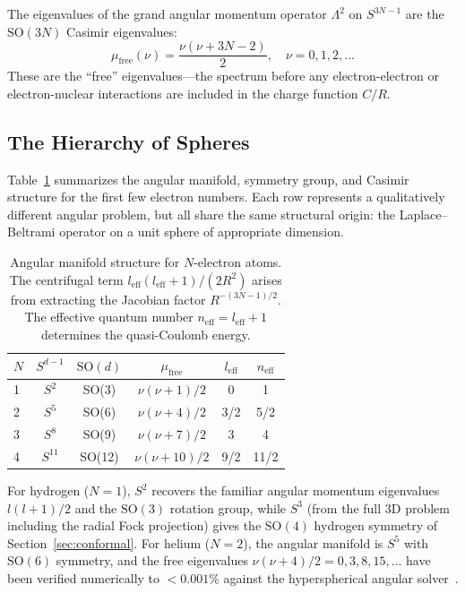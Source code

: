 \documentclass[aps,pra,twocolumn,superscriptaddress,longbibliography]{revtex4-2}
\begin{document}
The eigenvalues of the grand angular momentum operator $\Lambda^2$
on $S^{3N-1}$ are the $\mathrm{SO}(3N)$ Casimir eigenvalues:
\begin{equation}
  \mu_{\mathrm{free}}(\nu) = \frac{\nu(\nu + 3N - 2)}{2},
  \quad \nu = 0, 1, 2, \ldots
  \label{eq:casimir_general}
\end{equation}
These are the ``free'' eigenvalues---the spectrum before any
electron-electron or electron-nuclear interactions are included
in the charge function $C/R$.

\subsection{The Hierarchy of Spheres}

Table~\ref{tab:N_electron} summarizes the angular manifold, symmetry
group, and Casimir structure for the first few electron numbers.
Each row represents a qualitatively different angular problem,
but all share the same structural origin: the Laplace--Beltrami
operator on a unit sphere of appropriate dimension.

\begin{table}[h]
\caption{Angular manifold structure for $N$-electron atoms.
The centrifugal term $l_{\mathrm{eff}}(l_{\mathrm{eff}}+1)/(2R^2)$
arises from extracting the Jacobian factor $R^{-(3N-1)/2}$.
The effective quantum number $n_{\mathrm{eff}} = l_{\mathrm{eff}} + 1$
determines the quasi-Coulomb energy.}
\label{tab:N_electron}
\begin{ruledtabular}
\begin{tabular}{lccccc}
  $N$ & $S^{d-1}$ & $\mathrm{SO}(d)$ & $\mu_{\mathrm{free}}$
  & $l_{\mathrm{eff}}$ & $n_{\mathrm{eff}}$ \\
  \hline
  1 & $S^2$ & SO(3) & $\nu(\nu+1)/2$   & 0   & 1 \\
  2 & $S^5$ & SO(6) & $\nu(\nu+4)/2$   & 3/2 & 5/2 \\
  3 & $S^8$ & SO(9) & $\nu(\nu+7)/2$   & 3   & 4 \\
  4 & $S^{11}$ & SO(12) & $\nu(\nu+10)/2$ & 9/2 & 11/2 \\
\end{tabular}
\end{ruledtabular}
\end{table}

For hydrogen ($N = 1$), $S^2$ recovers the familiar angular momentum
eigenvalues $l(l+1)/2$ and the $\mathrm{SO}(3)$ rotation group, while
$S^3$ (from the full 3D problem including the radial Fock projection)
gives the $\mathrm{SO}(4)$ hydrogen symmetry of Section~\ref{sec:conformal}.
For helium ($N = 2$), the angular manifold is $S^5$ with
$\mathrm{SO}(6)$ symmetry, and the free eigenvalues
$\nu(\nu+4)/2 = 0, 3, 8, 15, \ldots$ have been verified numerically
to $< 0.001\%$ against the hyperspherical angular
solver~\cite{loutey_paper13}.
\end{document}

